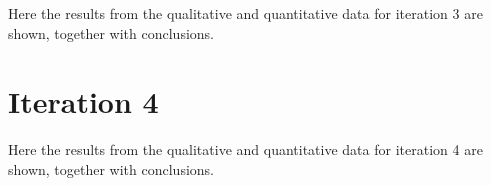 Here the results from the qualitative and quantitative data for iteration 3 are shown, together with conclusions.





\section{Iteration 4}

Here the results from the qualitative and quantitative data for iteration 4 are shown, together with conclusions.





%
%
%  
%  
%  
%  
%
%
%
%  
%  
%  
%  
%
%
%  
%  
%  
%  


%

